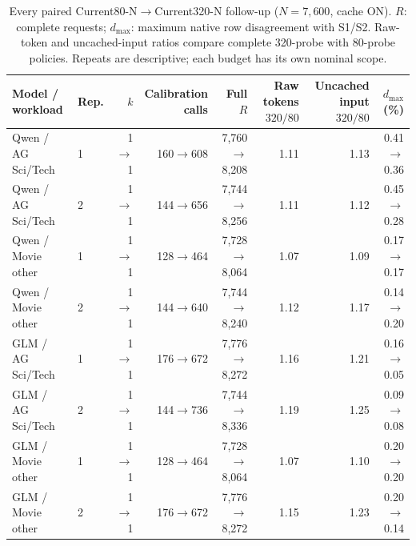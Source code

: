 \begin{table}[t]
\centering\small
\caption{Every paired Current80-N$\to$Current320-N follow-up ($N=7,600$, cache ON). $R$: complete requests; $d_{\max}$: maximum native row disagreement with S1/S2. Raw-token and uncached-input ratios compare complete 320-probe with 80-probe policies. Repeats are descriptive; each budget has its own nominal scope.}
\label{tab:budget_results}
\begin{tabular}{llrrrrrr}
\toprule
Model / workload & Rep. & $k$ & \shortstack{Calibration\\calls} & Full $R$ & \shortstack{Raw tokens\\$320/80$} & \shortstack{Uncached input\\$320/80$} & $d_{\max}$ (\%) \\
\midrule
Qwen / AG Sci/Tech & 1 & 1$\to$1 & 160$\to$608 & 7,760$\to$8,208 & 1.11 & 1.13 & 0.41$\to$0.36 \\
Qwen / AG Sci/Tech & 2 & 1$\to$1 & 144$\to$656 & 7,744$\to$8,256 & 1.11 & 1.12 & 0.45$\to$0.28 \\
Qwen / Movie other & 1 & 1$\to$1 & 128$\to$464 & 7,728$\to$8,064 & 1.07 & 1.09 & 0.17$\to$0.17 \\
Qwen / Movie other & 2 & 1$\to$1 & 144$\to$640 & 7,744$\to$8,240 & 1.12 & 1.17 & 0.14$\to$0.20 \\
GLM / AG Sci/Tech & 1 & 1$\to$1 & 176$\to$672 & 7,776$\to$8,272 & 1.16 & 1.21 & 0.16$\to$0.05 \\
GLM / AG Sci/Tech & 2 & 1$\to$1 & 144$\to$736 & 7,744$\to$8,336 & 1.19 & 1.25 & 0.09$\to$0.08 \\
GLM / Movie other & 1 & 1$\to$1 & 128$\to$464 & 7,728$\to$8,064 & 1.07 & 1.10 & 0.20$\to$0.20 \\
GLM / Movie other & 2 & 1$\to$1 & 176$\to$672 & 7,776$\to$8,272 & 1.15 & 1.23 & 0.20$\to$0.14 \\
\bottomrule
\end{tabular}
\end{table}
